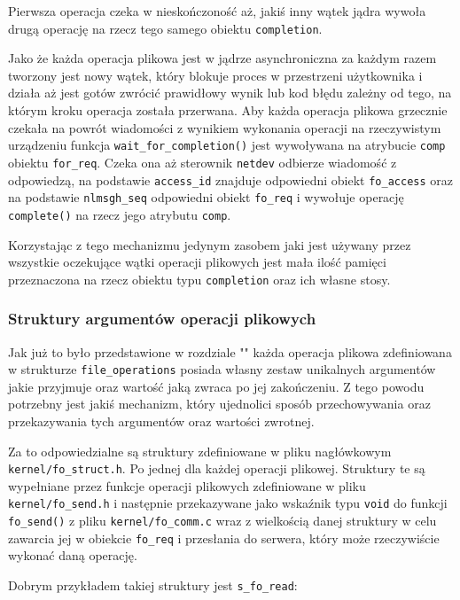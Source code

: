 \documentclass[10pt]{scrartcl}
\begin{document}
Pierwsza operacja czeka w nieskończoność aż, jakiś inny wątek jądra wywoła drugą operację na rzecz tego samego obiektu \texttt{completion}.

Jako że każda operacja plikowa jest w jądrze asynchroniczna za każdym razem tworzony jest nowy wątek, który blokuje proces w przestrzeni użytkownika i działa aż jest gotów zwrócić prawidłowy wynik lub kod błędu zależny od tego, na którym kroku operacja została przerwana. Aby każda operacja plikowa grzecznie czekała na powrót wiadomości z wynikiem wykonania operacji na rzeczywistym urządzeniu funkcja \texttt{wait\_for\_completion()} jest wywoływana na atrybucie \texttt{comp} obiektu \texttt{for\_req}. Czeka ona aż sterownik \texttt{netdev} odbierze wiadomość z odpowiedzą, na podstawie \texttt{access\_id} znajduje odpowiedni obiekt \texttt{fo\_access} oraz na podstawie \texttt{nlmsgh\_seq} odpowiedni obiekt \texttt{fo\_req} i wywołuje operację \texttt{complete()} na rzecz jego atrybutu \texttt{comp}.

Korzystając z tego mechanizmu jedynym zasobem jaki jest używany przez wszystkie oczekujące wątki operacji plikowych jest mała ilość pamięci przeznaczona na rzecz obiektu typu \texttt{completion} oraz ich własne stosy.

\subsubsection{Struktury argumentów operacji plikowych}

Jak już to było przedstawione w rozdziale "" każda operacja plikowa zdefiniowana w strukturze \texttt{file\_operations} posiada własny zestaw unikalnych argumentów jakie przyjmuje oraz wartość jaką zwraca po jej zakończeniu. Z tego powodu potrzebny jest jakiś mechanizm, który ujednolici sposób przechowywania oraz przekazywania tych argumentów oraz wartości zwrotnej.

Za to odpowiedzialne są struktury zdefiniowane w pliku nagłówkowym \texttt{kernel/fo\_struct.h}. Po jednej dla każdej operacji plikowej.  Struktury te są wypełniane przez funkcje operacji plikowych zdefiniowane w pliku \texttt{kernel/fo\_send.h} i następnie przekazywane jako wskaźnik typu \texttt{void} do funkcji \texttt{fo\_send()} z pliku \texttt{kernel/fo\_comm.c} wraz z wielkością danej struktury w celu zawarcia jej w obiekcie \texttt{fo\_req} i przesłania do serwera, który może rzeczywiście wykonać daną operację.

Dobrym przykładem takiej struktury jest \texttt{s\_fo\_read}:
\end{document}
